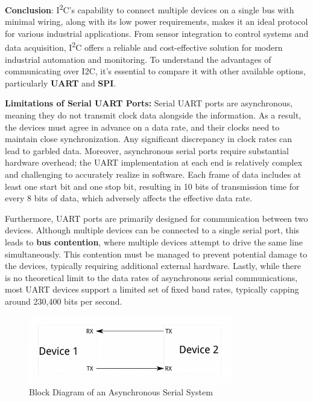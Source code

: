 \documentclass[a4paper,12pt]{report}
\begin{document}
\textbf{Conclusion}: I\textsuperscript{2}C’s capability to connect multiple devices on a single bus with minimal wiring, along with its low power requirements, makes it an ideal protocol for various industrial applications. From sensor integration to control systems and data acquisition, I\textsuperscript{2}C offers a reliable and cost-effective solution for modern industrial automation and monitoring.
\newpage 
To understand the advantages of communicating over I2C, it's essential to compare it with other available options, particularly \textbf{UART} and \textbf{SPI}.

\vspace{0.25in}

\textbf{Limitations of Serial UART Ports:}  
Serial UART ports are asynchronous, meaning they do not transmit clock data alongside the information. As a result, the devices must agree in advance on a data rate, and their clocks need to maintain close synchronization. Any significant discrepancy in clock rates can lead to garbled data. Moreover, asynchronous serial ports require substantial hardware overhead; the UART implementation at each end is relatively complex and challenging to accurately realize in software. Each frame of data includes at least one start bit and one stop bit, resulting in 10 bits of transmission time for every 8 bits of data, which adversely affects the effective data rate.

\vspace{0.25in}

Furthermore, UART ports are primarily designed for communication between two devices. Although multiple devices can be connected to a single serial port, this leads to \textbf{bus contention}, where multiple devices attempt to drive the same line simultaneously. This contention must be managed to prevent potential damage to the devices, typically requiring additional external hardware. Lastly, while there is no theoretical limit to the data rates of asynchronous serial communications, most UART devices support a limited set of fixed baud rates, typically capping around 230,400 bits per second.

\begin{figure}[htbp]
    \centering
    \includegraphics[width=0.8\textwidth]{uart_block_diagram.png} %
    \caption{Block Diagram of an Asynchronous Serial System}
    \label{fig:uart_block_diagram}
\end{figure}
\end{document}
